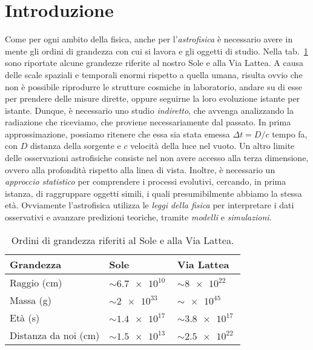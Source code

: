 \section{Introduzione}\label{sec:introduzione}
Come per ogni ambito della fisica, anche per l'\emph{astrofisica} è necessario avere in mente gli ordini di grandezza con cui si lavora e gli oggetti di studio. Nella tab.~\ref{tab:ordini-grandezza-sole-vialattea} sono riportate alcune grandezze riferite al nostro Sole e alla Via Lattea. A causa delle scale spaziali e temporali enormi rispetto a quella umana, risulta ovvio che non è possibile riprodurre le strutture cosmiche in laboratorio, andare su di esse per prendere delle misure dirette, oppure seguirne la loro evoluzione istante per istante. Dunque, è necessario uno studio \emph{indiretto}, che avvenga analizzando la radiazione che riceviamo, che proviene necessariamente dal passato. In prima approssimazione, possiamo ritenere che essa sia stata emessa $\Delta t = D / c$ tempo fa, con $D$ distanza della sorgente e $c$ velocità della luce nel vuoto. Un altro limite delle osservazioni astrofisiche consiste nel non avere accesso alla terza dimensione, ovvero alla profondità rispetto alla linea di vista. Inoltre, è necessario un \emph{approccio statistico} per comprendere i processi evolutivi, cercando, in prima istanza, di raggruppare oggetti simili, i quali presumibilmente abbiamo la stessa età. Ovviamente l'astrofisica utilizza le \emph{leggi della fisica} per interpretare i dati osservativi e avanzare predizioni teoriche, tramite \emph{modelli} e \emph{simulazioni}.

\begin{table}
    \caption{Ordini di grandezza riferiti al Sole e alla Via Lattea.}
    \label{tab:ordini-grandezza-sole-vialattea}
    \centering
    \begin{tabular}{lll}
    \toprule
    Grandezza & Sole & Via Lattea  \\
    \midrule
    Raggio (\si{cm}) & $\sim \SI{6.7e10}{}$ & $\sim \SI{8e22}{}$ \\
    Massa (\si{g}) & $\sim \SI{2e33}{}$    & $\sim \SI{e45}{}$    \\
    Età (\si{s}) & $\sim \SI{1.4e17}{}$  & $\sim \SI{3.8e17}{}$  \\
    Distanza da noi (\si{cm}) & $\sim \SI{1.5e13}{}$  & $\sim \SI{2.5e22}{}$  \\
    \bottomrule
    \end{tabular}
\end{table}